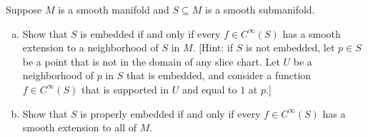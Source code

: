 Suppose $M$ is a smooth manifold and $S\subseteq M$ is a smooth submanifold.
\begin{enumerate}[a)]
\item Show that $S$ is embedded if and only if every $f \in C^\infty(S)$ has a smooth extension to a neighborhood of $S$ in $M$. [Hint: if $S$ is not embedded, let $p \in S$ be a point that is not in the domain of any slice chart.  Let $U$ be a neighborhood of $p$ in $S$ that is embedded, and consider a function $f \in C^\infty(S)$ that is supported in $U$ and equal to $1$ at $p$.]
\item Show that $S$ is properly embedded if and only if every $f \in C^\infty(S)$ has a smooth extension to all of $M$.
\end{enumerate}